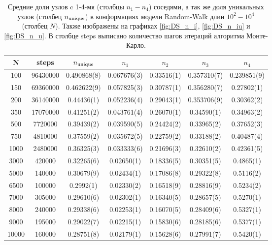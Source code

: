 \begin{table}[h]
    \centering

\begin{tabular}{|c|c|c|c|c|c|c|}
\hline
N & steps & $ n_{\textup{unique}} $ & $n_{1}$ & $n_{2}$ & $n_{3}$ & $n_{4}$ \\ \hline
100 & 96430000 & 0.490868(8) & 0.067676(3) & 0.33516(1) & 0.357310(7) & 0.239851(9) \\ \hline
150 & 69360000 & 0.462622(9) & 0.057825(3) & 0.30787(1) & 0.356280(7) & 0.27802(1) \\ \hline
200 & 36140000 & 0.44436(1) & 0.052236(4) & 0.29043(1) & 0.353706(9) & 0.30362(2) \\ \hline
350 & 17070000 & 0.41251(2) & 0.043761(4) & 0.26070(1) & 0.34590(1) & 0.34963(2) \\ \hline
500 & 7720000 & 0.39439(2) & 0.039590(5) & 0.24424(2) & 0.33965(2) & 0.37652(3) \\ \hline
750 & 4810000 & 0.37559(2) & 0.035672(5) & 0.22759(2) & 0.33188(2) & 0.40487(4) \\ \hline 
1000 & 2480000 & 0.36325(3) & 0.033333(6) & 0.21696(3) & 0.32610(2) & 0.42361(5) \\ \hline
3000 & 420000 & 0.32265(6) & 0.02650(1) & 0.18336(5) & 0.30351(5) & 0.4865(1) \\ \hline
5000 & 140000 & 0.30679(9) & 0.02434(1) & 0.17086(8) & 0.29322(8) & 0.5116(2) \\ \hline
6500 & 100000 & 0.2992(1) & 0.02330(2) & 0.16518(9) & 0.28816(9) & 0.5234(2) \\ \hline
7000 & 305000 & 0.29610(6) & 0.02302(1) & 0.16340(5) & 0.28657(5) & 0.5270(1) \\ \hline
8000 & 240000 & 0.29338(6) & 0.02253(1) & 0.16070(5) & 0.28409(6) & 0.5327(1) \\ \hline
9000 & 195000 & 0.29022(7) & 0.02215(1) & 0.15830(6) & 0.28185(6) & 0.5377(1) \\ \hline
10000 & 160000 & 0.28751(8) & 0.02179(1) & 0.15628(6) & 0.27991(7) & 0.5420(1) \\ \hline
\end{tabular}

    \caption{Средние доли узлов c 1-4-мя (столбцы $n_1-n_4$) соседями, а так же доля уникальных узлов (столбец $n_{\textup{unique}}$) в конформациях модели Random-Walk длин $10^{2}-10^{4}$ (столбец $N$). Также изображены на графиках \ref{fig:DS_n_i}, \ref{fig:DS_n_iu} и \ref{fig:DS_n_u}. В столбце steps выписано количество шагов итераций алгоритма Монте-Карло.}
    \label{tab:Ran_Walk_neigh}
\end{table}

